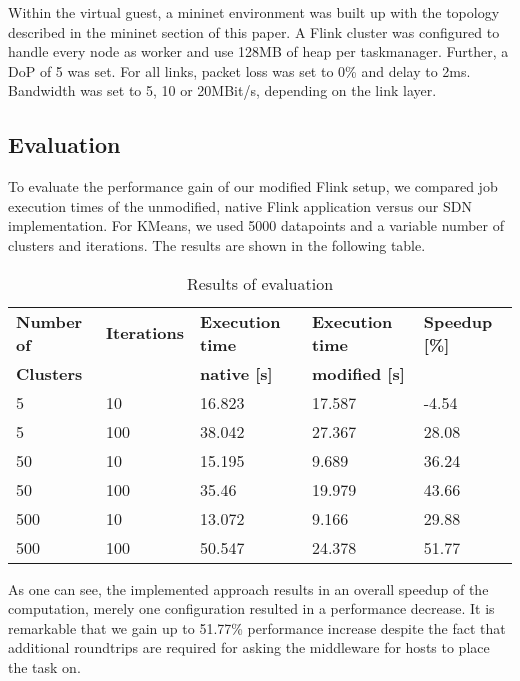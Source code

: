 Within the virtual guest, a mininet environment was built up with the topology described in the
mininet section of this paper. A Flink cluster was configured to handle every node as worker and use
128MB of heap per taskmanager. Further, a DoP of 5 was set. For all links, packet loss was set to 0\%
and delay to 2ms. Bandwidth was set to 5, 10 or 20MBit/s, depending on the link layer.

\subsection{Evaluation}
To evaluate the performance gain of our modified Flink setup, we compared job execution times of the
unmodified, native Flink application versus our SDN implementation. For KMeans, we used 5000
datapoints and a variable number of clusters and iterations. The results are shown in the following
table.

\begin{table}[h]
    \centering
    \begin{tabular}{| l | l | l | l | l | }
        \hline
        \textbf{Number of} & \textbf{Iterations} & \textbf{Execution time}
            & \textbf{Execution time} & \textbf{Speedup [\%]} \\
        \textbf{Clusters} & & \textbf{native [s]} & \textbf{modified [s]} & \\ \hline

        5 & 10 & 16.823 & 17.587 & -4.54 \\ \hline
        5 & 100 & 38.042 & 27.367 & 28.08 \\ \hline
        50 &10 &15.195 &9.689 &36.24 \\ \hline
        50 &100 &35.46 &19.979 &43.66 \\ \hline
        500 &10 &13.072 &9.166 &29.88 \\ \hline
        500 &100 &50.547 &24.378 &51.77 \\ \hline
    \end{tabular}
    \caption{Results of evaluation}
    \label{table:guest_properties}
\end{table}

As one can see, the implemented approach results in an overall speedup of the computation, merely
one configuration resulted in a performance decrease. It is remarkable that we gain up to 51.77\%
performance increase despite the fact that additional roundtrips are required for asking the
middleware for hosts to place the task on.

